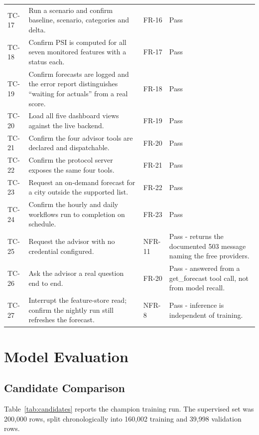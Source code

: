 \begin{xltabular}{\textwidth}{Q{1.3cm} P{4.4cm} Q{1.5cm} Y}
TC-17 & Run a scenario and confirm baseline, scenario, categories and delta. &
FR-16 & Pass \\
TC-18 & Confirm PSI is computed for all seven monitored features with a status
each. & FR-17 & Pass \\
TC-19 & Confirm forecasts are logged and the error report distinguishes ``waiting
for actuals'' from a real score. & FR-18 & Pass \\
TC-20 & Load all five dashboard views against the live backend. & FR-19 & Pass \\
TC-21 & Confirm the four advisor tools are declared and dispatchable. & FR-20 &
Pass \\
TC-22 & Confirm the protocol server exposes the same four tools. & FR-21 &
Pass \\
TC-23 & Request an on-demand forecast for a city outside the supported list. &
FR-22 & Pass \\
TC-24 & Confirm the hourly and daily workflows run to completion on schedule. &
FR-23 & Pass \\
TC-25 & Request the advisor with no credential configured. & NFR-11 & Pass -
returns the documented 503 message naming the free providers. \\
TC-26 & Ask the advisor a real question end to end. & FR-20 & Pass - answered
from a get\_forecast tool call, not from model recall. \\
TC-27 & Interrupt the feature-store read; confirm the nightly run still
refreshes the forecast. & NFR-8 & Pass - inference is independent of training. \\
\end{xltabular}

\section{Model Evaluation}

\subsection{Candidate Comparison}
Table~\ref{tab:candidates} reports the champion training run. The supervised set
was 200,000 rows, split chronologically into 160,002 training and 39,998
validation rows.

